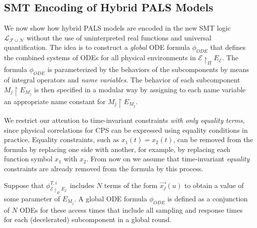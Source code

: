 \subsection{SMT Encoding of Hybrid PALS Models}


We now show how hybrid PALS models
are encoded in the new SMT logic $\mathcal{L}_{\mathcal{F}\cup\mathcal{N}}$
without the use of uninterpreted real functions and universal quantification.
The idea is to construct a \emph{global} ODE formula $\phi_{\mathit{ODE}}$
that defines the combined systems of ODEs for all physical environments
in $\mathcal{E} \restriction_{\Pi} E_\mathcal{E}$.
The formula $\phi_{\mathit{ODE}}$ is parameterized by the behaviors of 
the subcomponents by means of integral operators and \emph{name variables}.
The behavior of each subcomponent $M_j \restriction E_{M_j}$ is then
specified in a modular way by assigning to each name variable an appropriate name constant for $M_j \restriction E_{M_j}$.

We restrict our attention to time-invariant constraints \emph{with only equality terms},
since physical correlations for CPS can be expressed using equality conditions in practice.
Equality  constraints, such as $x_1(t) = x_2(t)$,  can be removed
from the formula  by replacing one side with another, 
for example, by replacing each function symbol $x_1$ with  $x_2$.
From now on we assume that time-invariant \emph{equality} constraints are already removed from the formula 
by this process.



Suppose that %
$\phi_{\mathcal{E} \restriction_{\Pi} E_\mathcal{E}}^{T,i}$ 
includes $N$ terms of the form $\vec{x_j}(u)$ to obtain a value of some parameter of $E_{M_j}$.
A global ODE formula $\phi_{\mathit{ODE}}$
is defined as a conjunction of $N$ ODEs for these access times
that include all sampling and response times for each (decelerated) subcomponent in a global round.

